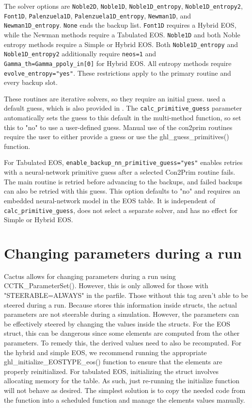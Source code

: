\documentclass{article}
\begin{document}
The solver options are \texttt{Noble2D}, \texttt{Noble1D},
\texttt{Noble1D\_entropy}, \texttt{Noble1D\_entropy2}, \texttt{Font1D},
\texttt{Palenzuela1D}, \texttt{Palenzuela1D\_entropy}, \texttt{Newman1D},
and \texttt{Newman1D\_entropy}. \texttt{None} ends the backup list.
\texttt{Font1D} requires a Hybrid EOS, while the Newman methods require a
Tabulated EOS. \texttt{Noble1D} and both Noble entropy methods require a
Simple or Hybrid EOS. Both \texttt{Noble1D\_entropy} and
\texttt{Noble1D\_entropy2} additionally require \texttt{neos=1} and
\texttt{Gamma\_th=Gamma\_ppoly\_in[0]} for Hybrid EOS. All entropy methods
require \texttt{evolve\_entropy="yes"}. These restrictions apply to the
primary routine and every backup slot.

These routines are iterative solvers, so they require an initial guess.
\igm{} used a default guess, which is also provided in \grhayl.
The \texttt{calc\_primitive\_guess} parameter automatically sets the
guess to this default in the multi-method function, so set this to
"no" to use a user-defined guess. Manual use of the con2prim
routines require the user to either provide a guess or use the
ghl\_guess\_primitives() function.

For Tabulated EOS, \texttt{enable\_backup\_nn\_primitive\_guess="yes"}
enables retries with a neural-network primitive guess after a selected
Con2Prim routine fails. The main routine is retried before advancing to
the backups, and failed backups can also be retried with this guess.
This option defaults to "no" and requires an embedded neural-network model
in the EOS table. It is independent of \texttt{calc\_primitive\_guess},
does not select a separate solver, and has no effect for Simple or Hybrid EOS.

\section{Changing parameters during a run}

Cactus allows for changing parameters during a run using CCTK\_ParameterSet().
However, this is only allowed for those with "STEERABLE=ALWAYS" in the parfile.
Those without this tag aren't able to be steered during a run. Because \glib{}
stores this information inside \grhayl{} structs, the actual parameters are not
steerable during a simulation. However, the parameters can be effectively steered
by changing the values inside the structs. For the EOS struct, this can be
dangerous since some elements are computed from the other parameters. To remedy
this, the derived values need to also be recomputed. For the hybrid and simple EOS,
we recommend running the appropriate ghl\_initialize\_EOSTYPE\_eos() function
to ensure that the elements are properly reinitialized. For tabulated EOS,
initializing the struct involves allocating memory for the table. As such,
just re-running the initialize function will not behave as desired. The simplest
solution is to copy the needed code from the \grhayl{} function into a scheduled
function and manage the elements values manually.

\end{document}
